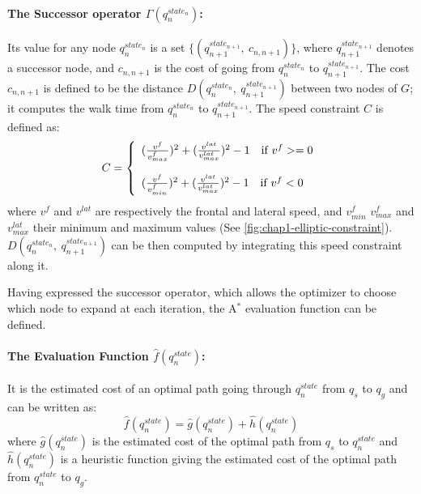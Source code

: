 \paragraph{The Successor operator $\Gamma(q_n^{state_n})$:}
Its value for any node $q_n^{state_n}$ is a set
$\{(q_{n+1}^{state_{n+1}},~c_{n,n+1})\}$, where
$q_{n+1}^{state_{n+1}}$ denotes a successor node, and $c_{n,n+1}$ is
the cost of going from $q_n^{state_n}$ to $q_{n+1}^{state_{n+1}}$. The
cost $c_{n,n+1}$ is defined to be the distance
$D(q_n^{state_n},~q_{n+1}^{state_{n+1}})$ between two nodes of $G$; it
computes the walk time from $q_n^{state_n}$ to
$q_{n+1}^{state_{n+1}}$. The speed constraint $C$ is defined as:
\begin{equation}
C = \left\{
\begin{array}{l l l}
  (\frac{v^{f}}{v_{max}^{f}})^2 +
  (\frac{v^{lat}}{v_{max}^{lat}})^2 - 1
  \quad \text{if } v^f >= 0 \\

  \\

  (\frac{v^{f}}{v_{min}^{f}})^2 +
  (\frac{v^{lat}}{v_{max}^{lat}})^2 - 1
  \quad \text{if } v^f < 0
\end{array} \right.
\end{equation}
where $v^{f}$ and $v^{lat}$ are respectively the frontal and lateral
speed, and $v_{min}^f$ $v_{max}^{f}$ and $v_{max}^{lat}$ their minimum
and maximum values (See
\autoref{fig:chap1-elliptic-constraint}). $D(q_n^{state_n},~q_{n+1}^{state_{n+1}})$
can be then computed by integrating this speed constraint along it.

Having expressed the successor operator, which allows the optimizer to
choose which node to expand at each iteration, the A$^{*}$ evaluation
function can be defined.

\paragraph{The Evaluation Function $\hat{f}(q_n^{state})$:}
It is the estimated cost of an optimal path going through
$q_n^{state}$ from $q_s$ to $q_g$ and can be written as:
\begin{equation}
  \hat{f}(q_n^{state}) = \hat{g}(q_n^{state}) + \hat{h}(q_n^{state})
\end{equation}
where $\hat{g}(q_n^{state})$ is the estimated cost of the optimal path
from $q_s$ to $q_n^{state}$ and $\hat{h}(q_n^{state})$ is a heuristic
function giving the estimated cost of the optimal path from
$q_n^{state}$ to $q_g$.

